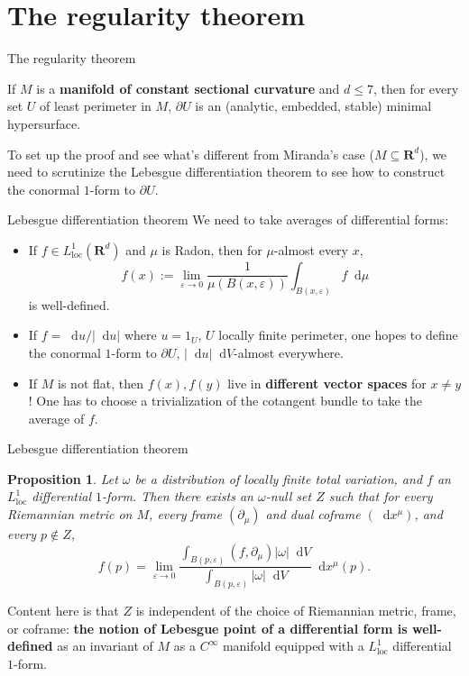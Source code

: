 \documentclass[10pt]{beamer}
\newcommand{\RR}{\mathbf{R}}
\newcommand*\dif{\mathop{}\!\mathrm{d}}
\newcommand{\loc}{\mathrm{loc}}
\newtheorem{proposition}{Proposition}
\begin{document}
\section{The regularity theorem}

\begin{frame}{The regularity theorem}
\begin{theorem}[--, '22]
If $M$ is a \textbf{manifold of constant sectional curvature} and $d \leq 7$, then for every set $U$ of least perimeter in $M$, $\partial U$ is an (analytic, embedded, stable) minimal hypersurface.
\end{theorem}

\pause

To set up the proof and see what's different from Miranda's case ($M \subseteq \RR^d$), we need to scrutinize the Lebesgue differentiation theorem to see how to construct the conormal $1$-form to $\partial U$.
\end{frame}

\begin{frame}{Lebesgue differentiation theorem}
We need to take averages of differential forms: \pause
\begin{itemize}
    \item If $f \in L^1_\loc(\RR^d)$ and $\mu$ is Radon, then for $\mu$-almost every $x$,
$$f(x) := \lim_{\varepsilon \to 0} \frac{1}{\mu(B(x, \varepsilon))} \int_{B(x, \varepsilon)} f \dif \mu$$
is well-defined.\pause 
    \item If $f = \dif u/|\dif u|$ where $u = 1_U$, $U$ locally finite perimeter, one hopes to define the conormal $1$-form to $\partial U$, $|\dif u|\dif V$-almost everywhere.\pause 
    \item If $M$ is not flat, then $f(x), f(y)$ live in \textbf{different vector spaces} for $x \neq y$! One has to choose a trivialization of the cotangent bundle to take the average of $f$.
\end{itemize}
\end{frame}

\begin{frame}{Lebesgue differentiation theorem}
\begin{proposition}
Let $\omega$ be a distribution of locally finite total variation, and $f$ an $L^1_\loc$ differential $1$-form.
Then there exists an $\omega$-null set $Z$ such that for every Riemannian metric on $M$, every frame $(\partial_\mu)$ and dual coframe $(\dif x^\mu)$, and every $p \notin Z$,
$$f(p) = \lim_{\varepsilon \to 0} \frac{\int_{B(p, \varepsilon)} (f, \partial_\mu) |\omega| \dif V}{\int_{B(p, \varepsilon)} |\omega| \dif V} \dif x^\mu(p).$$
\end{proposition}

Content here is that $Z$ is independent of the choice of Riemannian metric, frame, or coframe: \textbf{the notion of Lebesgue point of a differential form is well-defined} as an invariant of $M$ as a $C^\infty$ manifold equipped with a $L^1_\loc$ differential $1$-form.
\end{frame}
\end{document}
